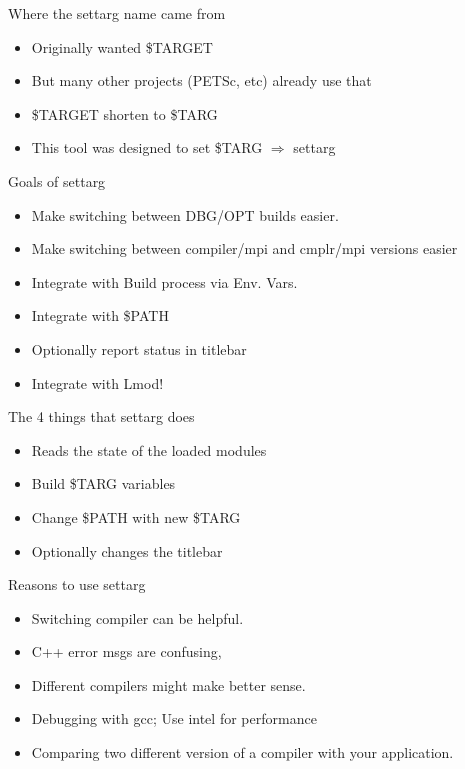 \documentclass{beamer}
\begin{document}
\begin{frame}{Where the settarg name came from}
  \begin{itemize}
    \item Originally wanted \$TARGET
    \item But many other projects (PETSc, etc) already use that
    \item \$TARGET shorten to \$TARG
    \item This tool was designed to set \$TARG $\Rightarrow$ {\color{blue}settarg}
  \end{itemize}
\end{frame}

\begin{frame}{Goals of settarg}
  \begin{itemize}
    \item Make switching between DBG/OPT builds easier.
    \item Make switching between compiler/mpi and cmplr/mpi versions easier
    \item Integrate with Build process via Env. Vars.
    \item Integrate with \$PATH
    \item Optionally report status in titlebar
    \item Integrate with Lmod!
  \end{itemize}
\end{frame}

\begin{frame}{The 4 things that settarg does}
  \begin{itemize}
    \item Reads the state of the loaded modules
    \item Build \$TARG variables
    \item Change \$PATH with new \$TARG
    \item Optionally changes the titlebar
  \end{itemize}
\end{frame}

\begin{frame}{Reasons to use settarg}
  \begin{itemize}
    \item Switching compiler can be helpful.
    \item C++ error msgs are confusing,
    \item Different compilers might make better sense.
    \item Debugging with gcc; Use intel for performance
    \item Comparing two different version of a compiler with your
      application.
  \end{itemize}
\end{frame}
\end{document}
